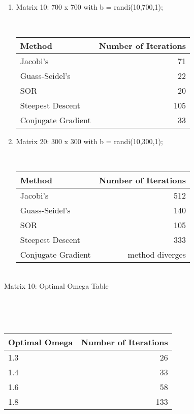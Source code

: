 \documentclass[letterpaper,12pt]{article}
\begin{document}
\begin{enumerate}
\begin{enumerate}
\item Matrix 10: 700 x 700 with b = randi(10,700,1);
\begin{center}
\\\begin{tabular}{|l|r|}
\hline
\textbf{Method}  & \textbf{Number of Iterations}\\ \hline
Jacobi's & 71\\ \hline
Guass-Seidel's & 22  \\ \hline
SOR & 20  \\\hline
Steepest Descent & 105 \\ \hline
Conjugate Gradient & 33\\ \hline
\end{tabular}
\end{center}

\item Matrix 20: 300 x 300 with b = randi(10,300,1);
\begin{center}
\\\begin{tabular}{|l|r|}
\hline
\textbf{Method}  & \textbf{Number of Iterations}\\ \hline
Jacobi's & 512\\ \hline
Guass-Seidel's & 140  \\ \hline
SOR & 105 \\\hline
Steepest Descent & 333 \\ \hline
Conjugate Gradient & method diverges\\ \hline
\end{tabular}
\end{center}



\end{enumerate}




\begin{enumerate}

\break{}
\begin{center}
\\Matrix 10: Optimal Omega Table
\end{center}



\\

\begin{center}
\\\begin{tabular}{|l|r|}
\hline
\textbf{Optimal Omega}  & \textbf{Number of Iterations}\\ \hline
1.3 & 26\\ \hline
1.4 & 33  \\ \hline
1.6 & 58  \\\hline
1.8 & 133 \\ \hline


\end{tabular}
\end{center}
\end{enumerate}
\end{enumerate}
\end{document}
